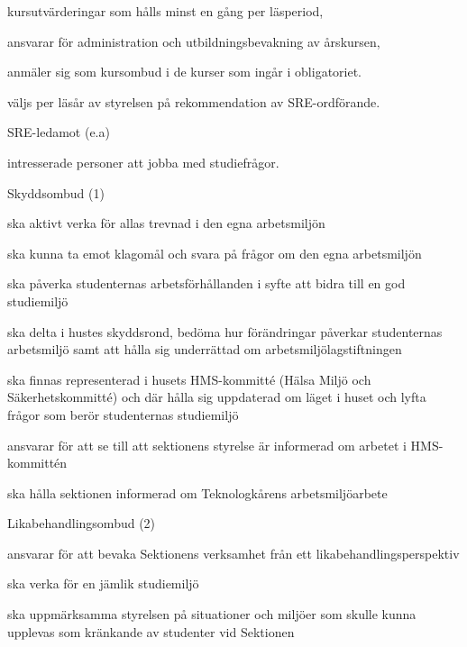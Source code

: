 \documentclass[10pt]{article}
\begin{document}
\begin{emptylist}
\begin{dashlist}
                kursutvärderingar som hålls minst en gång per läsperiod,
            \item ansvarar för administration och utbildningsbevakning av
                årskursen,
            \item anmäler sig som kursombud i de kurser som ingår i
                obligatoriet.
             \item väljs per läsår av styrelsen på rekommendation av SRE-ordförande.
        \end{dashlist}
    \item SRE-ledamot (e.a)
        \begin{dashlist}
            \item intresserade personer att jobba med studiefrågor.
        \end{dashlist}
    \item Skyddsombud (1)
        \begin{dashlist}
            \item ska aktivt verka för allas trevnad i den egna arbetsmiljön
            \item ska kunna ta emot klagomål och svara på frågor om den egna arbetsmiljön
            \item ska påverka studenternas arbetsförhållanden i syfte att bidra till en god studiemiljö
            \item ska delta i hustes skyddsrond, bedöma hur förändringar påverkar studenternas arbetsmiljö samt att
hålla sig underrättad om arbetsmiljölagstiftningen
			\item ska finnas representerad i husets HMS-kommitté (Hälsa Miljö och Säkerhetskommitté) och där hålla
sig uppdaterad om läget i huset och lyfta frågor som berör studenternas studiemiljö
			\item ansvarar för att se till att sektionens styrelse är informerad om arbetet i HMS-kommittén
			\item ska hålla sektionen informerad om Teknologkårens arbetsmiljöarbete
        \end{dashlist}
    \item Likabehandlingsombud (2)
        \begin{dashlist}
            \item ansvarar för att bevaka Sektionens verksamhet från ett likabehandlingsperspektiv
            \item ska verka för en jämlik studiemiljö
            \item ska uppmärksamma styrelsen på situationer och miljöer som skulle kunna upplevas som kränkande av studenter vid Sektionen

\end{dashlist}
\end{emptylist}
\end{document}
